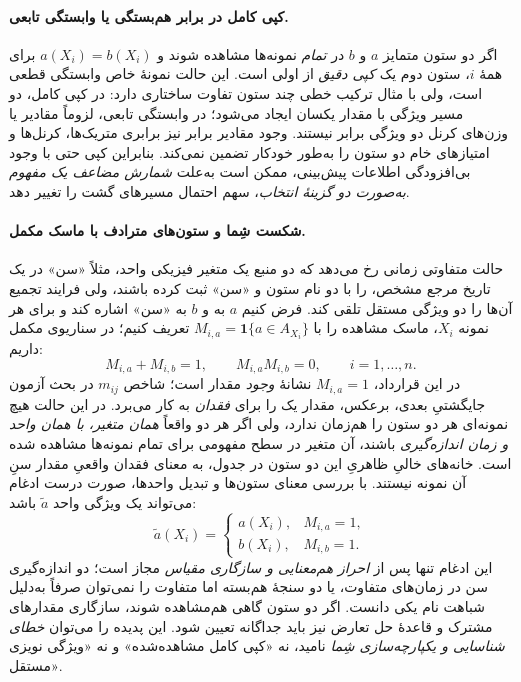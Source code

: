 \paragraph{کپی کامل در برابر هم‌بستگی یا وابستگی تابعی.}
اگر دو ستون متمایز $a$ و $b$ در
\emph{تمام} نمونه‌ها مشاهده شوند و
$a(X_i)=b(X_i)$ برای همهٔ $i$،
ستون دوم یک \emph{کپی دقیق} از اولی است.
این حالت نمونهٔ خاص وابستگی قطعی است،
ولی با مثال ترکیب خطی چند ستون تفاوت
ساختاری دارد: در کپی کامل، دو مسیر
ویژگی با مقدار یکسان ایجاد می‌شود؛
در وابستگی تابعی، لزوماً مقادیر یا
وزن‌های کرنل دو ویژگی برابر نیستند.
وجود مقادیر برابر نیز برابری
متریک‌ها، کرنل‌ها و امتیازهای خام دو ستون را
به‌طور خودکار تضمین نمی‌کند.
بنابراین کپی حتی با وجود بی‌افزودگی
اطلاعات پیش‌بینی، ممکن است به‌علت
\emph{شمارش مضاعف یک مفهوم به‌صورت دو
گزینهٔ انتخاب}، سهم احتمال مسیرهای
گشت را تغییر دهد.

\paragraph{شکست شِما و ستون‌های مترادف با ماسک مکمل.}
حالت متفاوتی زمانی رخ می‌دهد که دو منبع
یک متغیر فیزیکی واحد، مثلاً «سن» در
یک تاریخ مرجع مشخص، را با دو نام ستون
 و «سن» ثبت کرده باشند، ولی
فرایند تجمیع آن‌ها را دو ویژگی مستقل
تلقی کند. فرض کنیم $a$ به 
و $b$ به «سن» اشاره کند و برای هر
نمونه $X_i$، ماسک مشاهده را با
$M_{i,a}=\mathbf1\{a\in A_{X_i}\}$
تعریف کنیم؛ در سناریوی مکمل داریم:
\begin{equation}\label{cmp:eq:ch3-feature-schema-complementary-mask}
\boxed{
M_{i,a}+M_{i,b}=1,\qquad
M_{i,a}M_{i,b}=0,\qquad i=1,\ldots,n.
}
\end{equation}
در این قرارداد، $M_{i,a}=1$ نشانهٔ
\emph{وجود} مقدار است؛ شاخص $m_{ij}$
در بحث آزمون جایگشتیِ بعدی، برعکس،
مقدار یک را برای \emph{فقدان} به کار می‌برد.
در این حالت هیچ نمونه‌ای هر دو ستون را
هم‌زمان ندارد، ولی اگر هر دو واقعاً
\emph{همان متغیر، با همان واحد و
زمان اندازه‌گیری} باشند، آن متغیر
در سطح مفهومی برای تمام نمونه‌ها
مشاهده شده است. خانه‌های خالیِ
ظاهریِ این دو ستون در جدول، به معنای فقدان
واقعیِ مقدار سنِ آن نمونه نیستند.
با بررسی معنای ستون‌ها و تبدیل
واحدها، صورت درست ادغام می‌تواند
یک ویژگی واحد $\widetilde a$ باشد:
\begin{equation}\label{cmp:eq:ch3-feature-schema-merge}
\widetilde a(X_i)=
\begin{cases}
a(X_i),&M_{i,a}=1,\\
b(X_i),&M_{i,b}=1.
\end{cases}
\end{equation}
این ادغام تنها پس از \emph{احراز
هم‌معنایی و سازگاری مقیاس} مجاز است؛
دو اندازه‌گیری سن در زمان‌های متفاوت،
یا دو سنجهٔ هم‌بسته اما متفاوت را
نمی‌توان صرفاً به‌دلیل شباهت نام
یکی دانست. اگر دو ستون گاهی
هم‌مشاهده شوند، سازگاری مقدارهای
مشترک و قاعدهٔ حل تعارض نیز
باید جداگانه تعیین شود.
این پدیده را می‌توان
\emph{خطای شناسایی و یکپارچه‌سازی شِما}
نامید، نه «کپی کامل مشاهده‌شده»
و نه «ویژگی نویزی مستقل».

